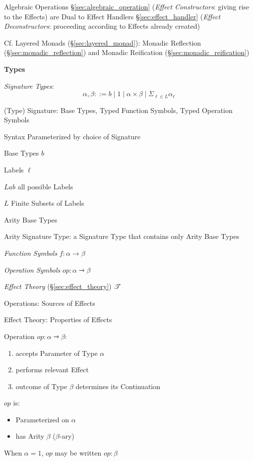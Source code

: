 Algebraic Operations \S\ref{sec:algebraic_operation} (\emph{Effect
  Constructors}: giving rise to the Effects) are Dual to Effect Handlers
\S\ref{sec:effect_handler} (\emph{Effect Deconstructors}: proceeding according
to Effects already created)

\fist Cf. Layered Monads (\S\ref{sec:layered_monad}): Monadic
Reflection (\S\ref{sec:monadic_reflection}) and Monadic Reification
(\S\ref{sec:monadic_reification})


\textbf{Types}

\emph{Signature Types}:
\[
  \alpha, \beta ::= b \;|\; 1 \;|\; \alpha \times \beta \;|\;
    \Sigma_{\ell \in L} \alpha_\ell
\]

(Type) Signature: Base Types, Typed Function Symbols, Typed Operation
Symbols

Syntax Parameterized by choice of Signature

Base Types $b$

Labels $\ell$

$Lab$ all possible Labels

$L$ Finite Subsets of Labels

Arity Base Types

Arity Signature Type: a Signature Type that contains only Arity Base
Types

\emph{Function Symbols} $f : \alpha \rightarrow \beta$

\emph{Operation Symbols} $op : \alpha \rightarrowtriangle \beta$

\emph{Effect Theory} (\S\ref{sec:effect_theory}) $\mathscr{T}$

Operations: Sources of Effects

Effect Theory: Properties of Effects

Operation $op : \alpha \rightarrowtriangle \beta$:
\begin{enumerate}
  \item accepts Parameter of Type $\alpha$
  \item performs relevant Effect
  \item outcome of Type $\beta$ determines its Continuation
\end{enumerate}

$op$ is:
\begin{itemize}
  \item Parameterized on $\alpha$
  \item has Arity $\beta$ ($\beta$-ary)
\end{itemize}

When $\alpha = 1$, $op$ may be written $op:\beta$

